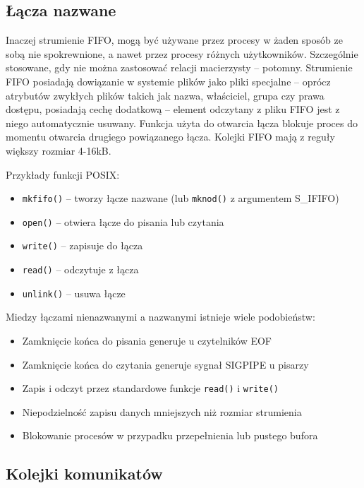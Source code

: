 \subsection{Łącza nazwane}

Inaczej strumienie FIFO, mogą być używane przez procesy w żaden sposób ze sobą nie spokrewnione, a nawet przez procesy różnych użytkowników. Szczególnie stosowane, gdy nie można zastosować relacji macierzysty -- potomny. Strumienie FIFO posiadają dowiązanie w systemie plików jako pliki specjalne -- oprócz atrybutów zwykłych plików takich jak nazwa, właściciel, grupa czy prawa dostępu, posiadają cechę dodatkową -- element odczytany z pliku FIFO jest z niego automatycznie usuwany. Funkcja użyta do otwarcia łącza blokuje proces do momentu otwarcia drugiego powiązanego łącza. Kolejki FIFO mają z reguły większy rozmiar 4-16kB.

Przykłady funkcji POSIX:
\begin{itemize}
	\item \texttt{mkfifo()} -- tworzy łącze nazwane (lub \texttt{mknod()} z argumentem S\_IFIFO)
    \item \texttt{open()} -- otwiera łącze do pisania lub czytania
    \item \texttt{write()} -- zapisuje do łącza
    \item \texttt{read()} -- odczytuje z łącza
    \item \texttt{unlink()} -- usuwa łącze
\end{itemize}

\newpage

Miedzy łączami nienazwanymi a nazwanymi istnieje wiele podobieństw:
\begin{itemize}
	\item Zamknięcie końca do pisania generuje u czytelników EOF
    \item Zamknięcie końca do czytania generuje sygnał SIGPIPE u pisarzy
    \item Zapis i odczyt przez standardowe funkcje \texttt{read()} i \texttt{write()}
    \item Niepodzielność zapisu danych mniejszych niż rozmiar strumienia
    \item Blokowanie procesów w przypadku przepełnienia lub pustego bufora
\end{itemize}

\subsection{Kolejki komunikatów}

